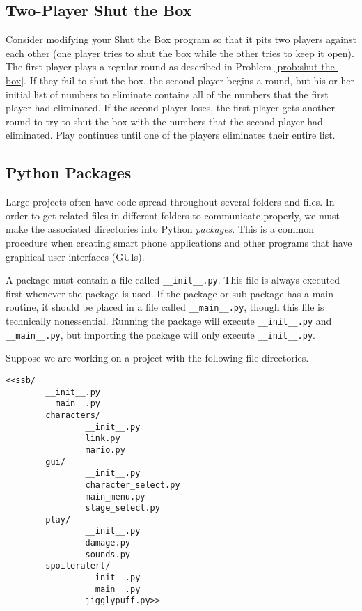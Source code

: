 \subsection*{Two-Player Shut the Box} %

Consider modifying your Shut the Box program so that it pits two players against each other (one player tries to shut the box while the other tries to keep it open).
The first player plays a regular round as described in Problem \ref{prob:shut-the-box}.
If they fail to shut the box, the second player begins a round, but his or her initial list of numbers to eliminate contains all of the numbers that the first player had eliminated.
If the second player loses, the first player gets another round to try to shut the box with the numbers that the second player had eliminated.
Play continues until one of the players eliminates their entire list.

\subsection*{Python Packages} %

Large projects often have code spread throughout several folders and files.
In order to get related files in different folders to communicate properly, we must make the associated directories into Python \emph{packages}.
This is a common procedure when creating smart phone applications and other programs that have graphical user interfaces (GUIs).

A package must contain a file called \texttt{\_\_init\_\_.py}.
This file is always executed first whenever the package is used.
If the package or sub-package has a main routine, it should be placed in a file called \texttt{\_\_main\_\_.py}, though this file is technically nonessential.
Running the package will execute \texttt{\_\_init\_\_.py} and \texttt{\_\_main\_\_.py}, but importing the package will only execute \texttt{\_\_init\_\_.py}.

Suppose we are working on a project with the following file directories.

\begin{lstlisting}
<<ssb/
        __init__.py
        __main__.py
        characters/
                __init__.py
                link.py
                mario.py
        gui/
                __init__.py
                character_select.py
                main_menu.py
                stage_select.py
        play/
                __init__.py
                damage.py
                sounds.py
        spoileralert/
                __init__.py
                __main__.py
                jigglypuff.py>>
\end{lstlisting}

